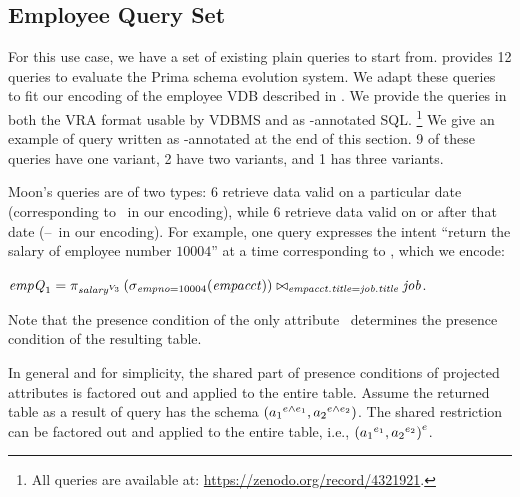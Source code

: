 \subsection{Employee Query Set}
\label{sec:emp-qs}




For this use case, we have a set of existing plain queries to start from.
\citet{prima08Moon} provides 12 queries to evaluate the Prima schema evolution
system. We adapt these queries to fit our encoding of the employee VDB
described in .
%
We provide the queries in both the VRA format usable by VDBMS and as
-annotated SQL.%
\footnote{All queries are available at: \url{https://zenodo.org/record/4321921}.}
%
We give an example of query written as -annotated at the end of this section.
%
9 of these queries have one variant, 2 have two variants, and 1 has three
variants. 


Moon's queries are of two types: 6 retrieve data valid on a particular date
(corresponding to \vThree\ in our encoding), while 6 retrieve data valid on or
after that date (\vThree--\vFive\ in our encoding).
%
For example, one query expresses the intent ``return the salary of employee
number $10004$'' at a time corresponding to \vThree, which we encode:
\centerline{
\ensuremath{
\eq_1 = \vPrj[\oatt{\salary}{\vThree}]{%
  \joinRelR{\selectRel{\empno=10004}{(\empacct)}}{\job}
           {\empacct.\titleatt = \job.\titleatt}}
}.}
 Note that the presence condition of the only attribute \salary\ determines the
 presence condition of the resulting table.

 In general and for simplicity, the shared part of presence conditions of
  projected attributes is factored out and applied to 
  the entire table. Assume the returned table as a result of
  query has the schema $\left(\oatt {\vAtt_1} {\dimMeta \wedge \dimMeta_1}, 
  \oatt {\vAtt_2} {\dimMeta \wedge \dimMeta_2} \right)$.
 The shared restriction can be factored out and applied
 to the entire table, i.e., $\left( \oatt {\vAtt_1} {\dimMeta_1},
 \oatt {\vAtt_2} {\dimMeta_2} \right)^\dimMeta$.
%

